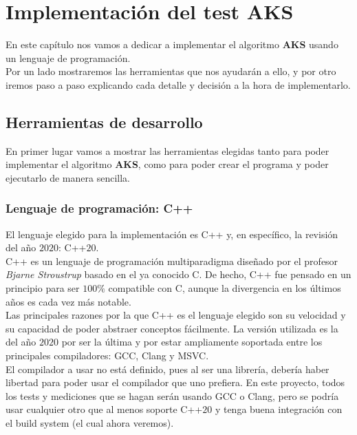 \chapter{Implementación del test AKS}

En este capítulo nos vamos a dedicar a implementar el algoritmo \textbf{AKS} usando un lenguaje de programación.\\

Por un lado mostraremos las herramientas que nos ayudarán a ello, y por otro iremos paso a paso explicando cada detalle y decisión a la hora de implementarlo.

\section{Herramientas de desarrollo}

En primer lugar vamos a mostrar las herramientas elegidas tanto para poder implementar el algoritmo \textbf{AKS}, como para poder crear el programa y poder ejecutarlo de manera sencilla.\\

\subsection{Lenguaje de programación: C++}

El lenguaje elegido para la implementación es C++ y, en específico, la revisión del año $2020$: C++$20$.\\

C++ es un lenguaje de programación multiparadigma diseñado por el profesor \textit{Bjarne Stroustrup} \cite{bjarne_stroustrup} basado en el ya conocido C. De hecho, C++ fue pensado en un principio para ser $100\%$ compatible con C, aunque la divergencia en los últimos años es cada vez más notable.\\

Las principales razones por la que C++ es el lenguaje elegido son su velocidad y su capacidad de poder abstraer conceptos fácilmente. La versión utilizada es la del año $2020$ por ser la última y por estar ampliamente soportada entre los principales compiladores: GCC, Clang y MSVC.\\

El compilador a usar no está definido, pues al ser una librería, debería haber libertad para poder usar el compilador que uno prefiera. En este proyecto, todos los tests y mediciones que se hagan serán usando GCC o Clang, pero se podría usar cualquier otro que al menos soporte C++$20$ y tenga buena integración con el build system (el cual ahora veremos).

